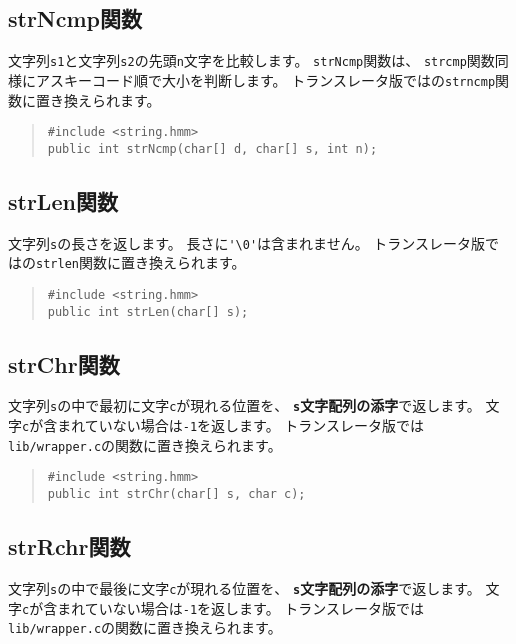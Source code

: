 \subsection{strNcmp関数}

文字列\verb/s1/と文字列\verb/s2/の先頭\verb/n/文字を比較します。
\verb/strNcmp/関数は、
\verb/strcmp/関数同様にアスキーコード順で大小を判断します。
トランスレータ版では\cl の\verb/strncmp/関数に置き換えられます。

\begin{quote}
\begin{verbatim}
#include <string.hmm>
public int strNcmp(char[] d, char[] s, int n);
\end{verbatim}
\end{quote}

\subsection{strLen関数}

文字列\verb/s/の長さを返します。
長さに\verb/'\0'/は含まれません。
トランスレータ版では\cl の\verb/strlen/関数に置き換えられます。

\begin{quote}
\begin{verbatim}
#include <string.hmm>
public int strLen(char[] s);
\end{verbatim}
\end{quote}

\subsection{strChr関数}

文字列\verb/s/の中で最初に文字\verb/c/が現れる位置を、
{\bf\verb/s/文字配列の添字}で返します。
文字\verb/c/が含まれていない場合は\verb/-1/を返します。
トランスレータ版では\verb;lib/wrapper.c;の関数に置き換えられます。

\begin{quote}
\begin{verbatim}
#include <string.hmm>
public int strChr(char[] s, char c);
\end{verbatim}
\end{quote}

\subsection{strRchr関数}

文字列\verb/s/の中で最後に文字\verb/c/が現れる位置を、
{\bf\verb/s/文字配列の添字}で返します。
文字\verb/c/が含まれていない場合は\verb/-1/を返します。
トランスレータ版では\verb;lib/wrapper.c;の関数に置き換えられます。

